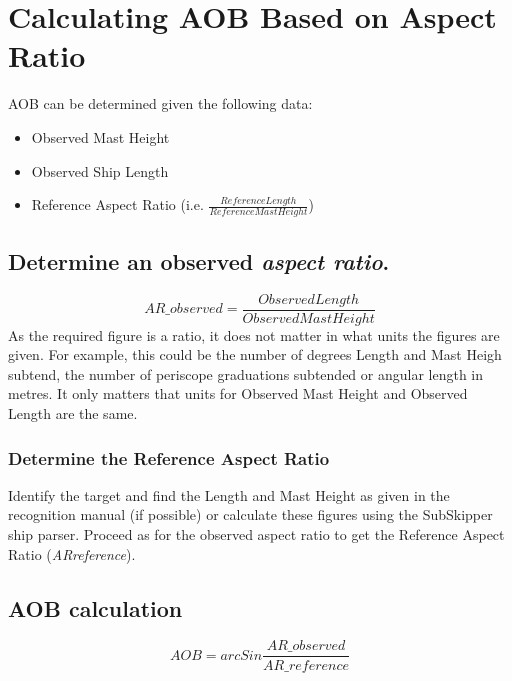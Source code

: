 \documentclass{article}
\begin{document}
\section{Calculating AOB Based on Aspect Ratio}


AOB can be determined given the following data:
\begin{itemize}
\item{Observed Mast Height}
\item{Observed Ship Length}
\item{Reference Aspect Ratio (i.e. $\frac{Reference Length}{Reference Mast Height}$)}
\end{itemize}

\subsection{Determine an observed \emph{aspect ratio}.}
$$AR\_{observed} = \frac{Observed Length}{Observed Mast Height}$$
As the required figure is a ratio, it does not matter in what units the figures are given. For example, this could be the number of degrees Length and Mast Heigh subtend, the number of periscope graduations subtended or angular length in metres. It only matters that units for Observed Mast Height and Observed Length are the same.

\subsubsection{Determine the Reference Aspect Ratio}
Identify the target and find the Length and Mast Height as given in the recognition manual (if possible) or calculate these figures using the SubSkipper ship parser. Proceed as for the observed aspect ratio to get the Reference Aspect Ratio (\emph{ARreference}).

\subsection{AOB calculation}
$$AOB = arcSin \frac{AR\_{observed}}{AR\_{reference}}$$
\end{document}
